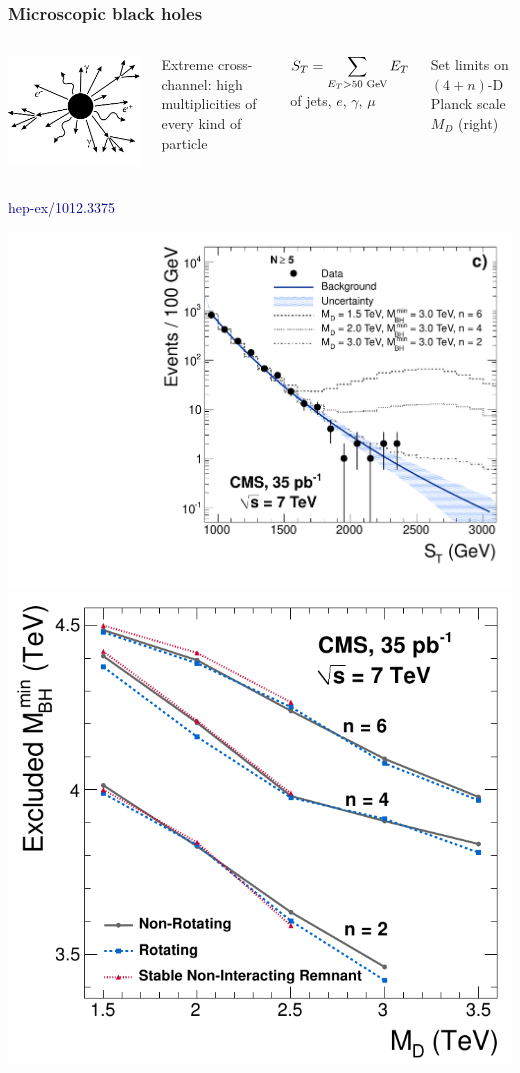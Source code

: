 \documentclass[compress]{beamer}
\begin{document}
\begin{frame}
\frametitle{Microscopic black holes}

\begin{columns}
\includegraphics[width=\linewidth]{figures/blackhole_diagram.jpg}

Extreme cross-channel: high multiplicities of every kind of particle

\vspace{-0.3 cm}
\hfill $\displaystyle S_T = \sum_{E_T > 50\mbox{\scriptsize~GeV}} E_T$ of jets, $e$, $\gamma$, $\mu$

\vspace{0.35 cm}
Set limits on $(4+n)$-D Planck scale $M_D$ (right)
\end{columns}

\vspace{0.35 cm}
\hfill \textcolor{darkblue}{\scriptsize hep-ex/1012.3375}

\includegraphics[width=0.45\linewidth]{plots/blackhole_st_5.pdf} \hfill
\includegraphics[width=0.45\linewidth]{plots/blackhole_planckscale.png}
\end{frame}
\end{document}
